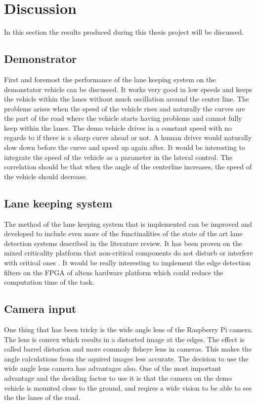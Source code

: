 \chapter{Discussion}
In this section the results produced during this thesis project will be discussed.
\section{Demonstrator}
First and foremost the performance of the lane keeping system on the demonstator vehicle can be discussed. It works very good in low speeds and keeps the vehicle within the lanes without much oscillation around the center line. The problems arises when the speed of the vehicle rises and naturally the curves are the part of the road where the vehicle starts having problems and cannot fully keep within the lanes. The demo vehicle drives in a constant speed with no regards to if there is a sharp curve ahead or not. A human driver would naturally slow down before the curve and speed up again after. It would be interesting to integrate the speed of the vehicle as a parameter in the lateral control. The correlation should be that when the angle of the centerline increases, the speed of the vehicle should decrease. \\


\section{Lane keeping system}
The method of the lane keeping system that is implemented can be improved and developed to include even more of the functinalities of the state of the art lane detection systems described in the literature review. It has been proven on the mixed criticality platform that non-critical components do not disturb or interfere with critical ones \cite{zaki2016}. It would be really interesting to implement the edge detection filters on the FPGA of altens hardware platform which could reduce the computation time of the task.\\

\section{Camera input}
One thing that has been tricky is the wide angle lens of the Raspberry Pi camera. The lens is convex which results in a distorted image at the edges. The effect is called barrel distorion and more commoly fisheye lens in cameras. This makes the angle calculations from the aquired images less accurate. The decision to use the wide angle lens camera has advantages also. One of the most important advantage and the deciding factor to use it is that the camera on the demo vehicle is mounted close to the ground, and reqires a wide vision to be able to see the the lanes of the road.\\

